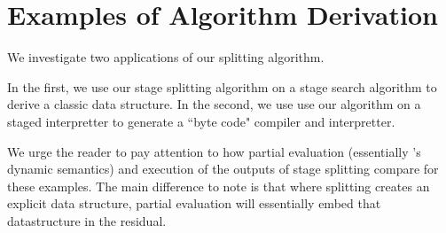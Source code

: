 

\section{Examples of Algorithm Derivation}
\label{sec:examples}

We investigate two applications of our splitting algorithm.

In the first, we use our stage splitting algorithm on a stage search algorithm to derive a classic data structure.
In the second, we use use our algorithm on a staged interpretter to generate a ``byte code" compiler and interpretter.
 
We urge the reader to pay attention to how partial evaluation (essentially \lang's dynamic semantics) and execution of the outputs of stage splitting compare for these examples.
The main difference to note is that where splitting creates an explicit data structure, partial evaluation will
essentially embed that datastructure in the residual. 

%
%
%
%
%
%

